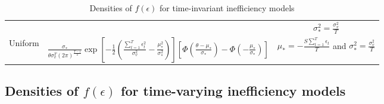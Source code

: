 \documentclass[nojss]{jss}
\begin{document}
\begin{appendix}
\begin{table}[h]
\begin{adjustbox}{max width=0.9\textwidth}
\begin{tabular}{@{}ccc@{}}
& & $\sigma_*^2 = \frac{\sigma_v^2}{T}$ \\
Uniform & $\frac{\sigma_*}{\theta\sigma_v^T\left(2\pi\right)^{\frac{T-1}{2}}}\exp{\left[-\frac{1}{2}\left(\frac{\sum_{t=1}^T\epsilon_t^2}{\sigma_v^2}-\frac{\mu_*^2}{\sigma_*^2}\right)\right]}\left[\Phi\left(\frac{\theta-\mu_*}{\sigma_*}\right)-\Phi\left(-\frac{\mu_*}{\sigma_*}\right)\right]$ & 
$\mu_* = -\frac{S\sum_{t=1}^T\epsilon_t}{T}$ and $\sigma_*^2 = \frac{\sigma_v^2}{T}$\\
\bottomrule
\end{tabular}
\end{adjustbox}
\caption{Densities of $f(\epsilon)$ for time-invariant inefficiency models}
\label{table:mlpl81}
\end{table}

\newpage

\subsection{Densities of $f(\epsilon)$ for time-varying inefficiency models}


\end{appendix}
\end{document}
